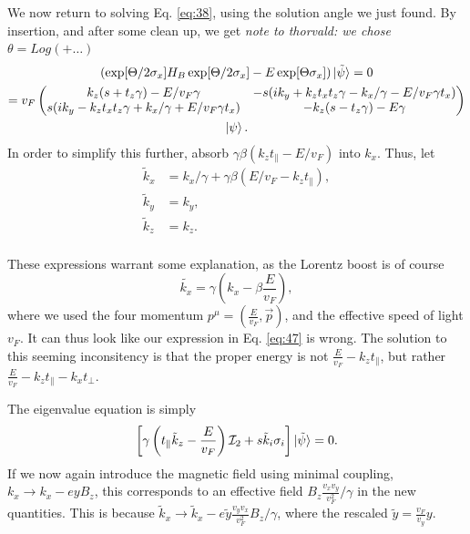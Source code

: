 We now return to solving Eq. \eqref{eq:38}, using the solution angle we just found.
By insertion, and after some clean up, we get
\emph{note to thorvald: we chose \(\theta = Log \left(+ \dots\right) \)}
\begin{multline}
  \label{eq:46}
  (\exp[\Theta /2 \sigma_{x}] H_{B}\exp[\Theta /2 \sigma_{x}] - E \exp[\Theta \sigma_{x}]) \ket{\tilde{\psi}} = 0\\
  = v_F \begin{pmatrix}
          k_z ( s + t_z \gamma ) - E / v_F \gamma & -s ( ik_y + k_z t_x t_z \gamma - k_x / \gamma - E /v_{F} \gamma t_x)\\
          s ( i k_y - k_z t_x t_z \gamma + k_x / \gamma + E /v_F \gamma t_x) & - k_z (s - t_z \gamma) - E \gamma
        \end{pmatrix}\\
    \ket{\psi}.
\end{multline}
In order to simplify this further, absorb \(\gamma \beta (k_{z} t_{\parallel} - E /v_{F}) \) into \(k_{x}\).
Thus, let
\begin{equation}
  \label{eq:47}
  \begin{split}
    \tilde{k}_{x} &= k_{x} / \gamma + \gamma \beta ( E /v_F - k_{z} t_{\parallel}),\\
    \tilde{k}_{y} &=  k_{y},\\
    \tilde{k}_{z} &=  k_{z}.\\
  \end{split}
\end{equation}

These expressions warrant some explanation, as the Lorentz boost is of course
\begin{equation}
  \label{eq:48}
  \tilde{k_x} = \gamma (k_x - \beta \frac{E}{v_{F}}),
\end{equation}
where we used the four momentum \( p^{\mu } = (\frac{E}{v_{F}}, \vec{p}) \), and the effective speed of light \( v_F \).
It can thus look like our expression in Eq. \eqref{eq:47} is wrong.
The solution to this seeming inconsitency is that the proper energy is not \( \frac{E}{v_{F}} - k_z t_{\parallel} \), but rather \( \frac{E}{v_{F}} - k_z t_{\parallel} - k_x t_{\perp}\).

The eigenvalue equation is simply
\begin{equation}
  \label{eq:49}
  \left[  \gamma \left( t_{\parallel} \tilde{k}_{z} - \frac{E}{v_{F}} \right) \mathcal{I}_{2} +
  s \tilde{k}_{i} \sigma _{i} \right] \ket{\tilde{\psi}}= 0.
\end{equation}
If we now again introduce the magnetic field using minimal coupling, \(k_{x} \to  k_{x} - ey B_{z} \), this corresponds to an effective field \(B_{z} \frac{v_{x} v_{y}}{v_{F}^2} / \gamma \) in the new quantities.
This is because \(\tilde{k}_{x} \to  \tilde{k}_{x} - e \tilde{y} \frac{v_{y} v_{x}}{v_{F}^2}  B_{z} /\gamma \), where the rescaled \(\tilde{y} = \frac{v_{F}}{v_{y}} y\).

